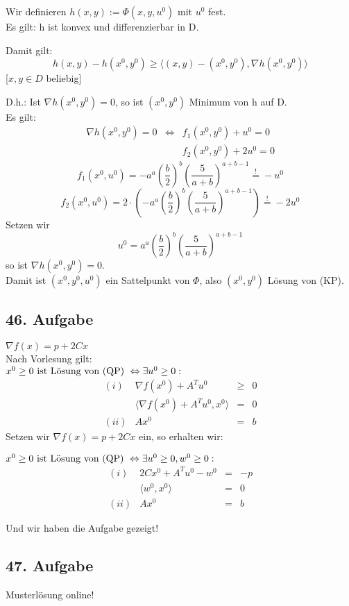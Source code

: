 \documentclass[a4paper,11pt,twoside,titlepage]{article}
\begin{document}
Wir definieren $h(x,y):=\Phi(x,y,u^0)$ mit $u^0$ fest.\\
Es gilt: h ist konvex und differenzierbar in D.

Damit gilt:
\[h(x,y)-h(x^0,y^0)\geq\langle(x,y)-(x^0,y^0),\nabla h(x^0,y^0)\rangle\]
[$x,y\in D$ beliebig]

D.h.: Ist $\nabla h(x^0,y^0)=0$, so ist $(x^0,y^0)$ Minimum von h auf D.\\
Es gilt:
\begin{eqnarray*}
\nabla h(x^0,y^0)=0&\Leftrightarrow&f_1(x^0,y^0)+u^0=0\\
&&f_2(x^0,y^0)+2u^0=0\end{eqnarray*}
\[f_1(x^0,u^0)=-a^a(\frac b2)^b(\frac{5}{a+b})^{a+b-1}\stackrel{!}{=}-u^0\]
\[f_2(x^0,u^0)=2\cdot(-a^a(\frac b2)^b(\frac{5}{a+b})^{a+b-1})\stackrel{!}{=}-2u^0\]
Setzen wir
\[u^0=a^a(\frac b2)^b(\frac{5}{a+b})^{a+b-1}\]
so ist $\nabla h(x^0,y^0)=0$.\\
Damit ist $(x^0,y^0,u^0)$ ein Sattelpunkt von $\Phi$, also $(x^0,y^0)$ Lösung von (KP).

\subsection*{46. Aufgabe}
$\nabla f(x)=p+2Cx$\\
Nach Vorlesung gilt:\\
$x^0\geq0\textnormal{ ist Lösung von (QP) }\Leftrightarrow \exists u^0\geq0:$
\[\begin{array}{clcl}(i)&\nabla f(x^0)+A^Tu^0&\geq&0\\&\langle \nabla f(x^0)+A^Tu^0,x^0\rangle&=&0\\
(ii)&Ax^0&=&b\end{array}\]
Setzen wir $\nabla f(x)=p+2Cx$ ein, so erhalten wir:

$x^0\geq0\textnormal{ ist Lösung von (QP) }\Leftrightarrow \exists u^0\geq0,w^0\geq0:$
\[\begin{array}{clcl}(i)&2Cx^0+A^Tu^0-w^0&=&-p\\&\langle w^0,x^0\rangle&=&0\\
(ii)&Ax^0&=&b\end{array}\]

Und wir haben die Aufgabe gezeigt!\newline
[$w^0=\nabla f(x^0)+A^Tu^0$ Schlupfvariable]

\subsection*{47. Aufgabe}
Musterlösung online!
\end{document}

